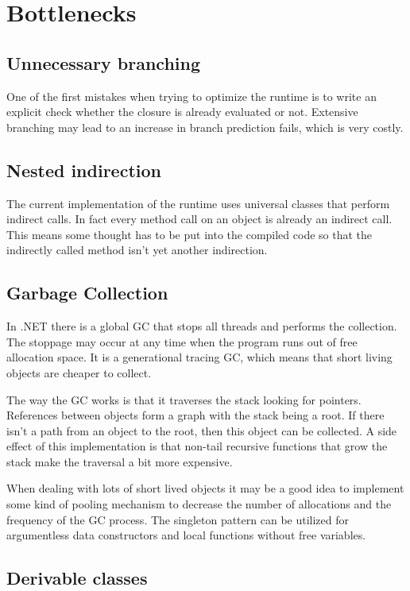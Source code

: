 \documentclass[en]{pracamgr}
\begin{document}
\section{Bottlenecks}

\subsection{Unnecessary branching}

One of the first mistakes when trying to optimize the runtime
is to write an explicit check whether the closure is
already evaluated or not.
Extensive branching may lead to an increase in branch
prediction fails, which is very costly.

\subsection{Nested indirection}

The current implementation of the runtime uses universal
classes that perform indirect calls.
In fact every method call on an object is already an indirect call.
This means some thought has to be put into the compiled code
so that the indirectly called method isn't yet another
indirection.

\subsection{Garbage Collection}

In .NET there is a global GC that stops all threads
and performs the collection.
The stoppage may occur at any time when the program
runs out of free allocation space.
It is a generational tracing GC,
which means that short living objects are cheaper to collect.

The way the GC works is that it traverses the stack looking
for pointers. References between objects form a graph with
the stack being a root. If there isn't a path from an object
to the root, then this object can be collected.
A side effect of this implementation is that
non-tail recursive functions that grow the stack
make the traversal a bit more expensive.

When dealing with lots of short lived objects it may be
a good idea to implement some kind of pooling mechanism
to decrease the number of allocations and the frequency of
the GC process. The singleton pattern can be utilized
for argumentless data constructors and local functions
without free variables.

\subsection{Derivable classes}
\end{document}
